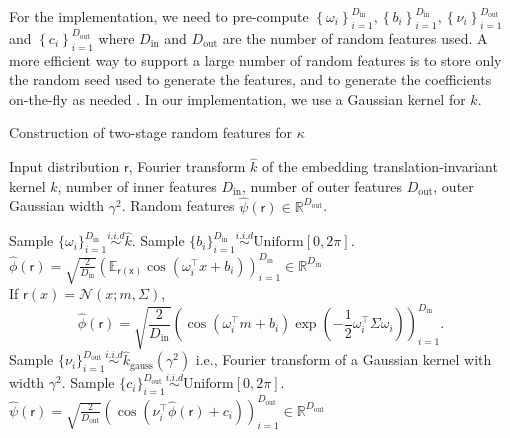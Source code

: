 \documentclass[english]{article}
\theoremstyle{plain}
\theoremstyle{plain}
\begin{document}
For the implementation, we need to pre-compute $\left\{ \omega_{i}\right\} _{i=1}^{D_\mathrm{in}},\left\{ b_{i}\right\} _{i=1}^{D_\mathrm{in}},\left\{ \nu_{i}\right\} _{i=1}^{D_\mathrm{out}}$
and $\left\{ c_{i}\right\} _{i=1}^{D_\mathrm{out}}$ where $D_\mathrm{in}$ and
$D_\mathrm{out}$ are the number of random features used. 
A more efficient way to support a large number of random features 
is to store only the random seed used to generate 
the features, and to generate the coefficients  on-the-fly as needed \citep{Dai2014}. 
In our implementation, we use a Gaussian kernel for $k$.



\begin{algorithm}[t]
\caption{Construction of two-stage random features for $\kappa$}
\label{algo:random_features_kgg}
\begin{algorithmic}[1]
\REQUIRE Input distribution $\mathsf{r}$, Fourier transform $\hat{k}$ of 
the embedding translation-invariant kernel $k$, number of inner features $D_\mathrm{in}$, number of outer features $D_\mathrm{out}$, outer Gaussian width $\gamma^2$.
\ENSURE Random features $\hat{\psi}(\mathsf{r}) \in \mathbb{R}^{D_\mathrm{out}}$. 

\STATE Sample  $\{ \omega_i \}_{i=1}^{D_\mathrm{in}} \overset{i.i.d}{\sim} \hat{k}$.
\STATE Sample $\{b_i\}_{i=1}^{D_\mathrm{in}} \overset{i.i.d}{\sim} \text{Uniform}[0, 2\pi] $.
\STATE $\hat{\phi}(\mathsf{r}) = \sqrt{\frac{2}{D_\mathrm{in}}} \left( \mathbb{E}_{\mathsf{r(x)}} 
\cos(\omega_{i}^{\top}x+b_{i} ) \right)_{i=1}^{D_\mathrm{in}} \in \mathbb{R}^{D_\mathrm{in}}$ \\
If $\mathsf{r}(x)=\mathcal{N}(x;m, \Sigma )$, 
\small
\begin{equation*}
\hat{\phi}( \mathsf{r}) = \sqrt{\frac{2}{D_\mathrm{in}}} \left( \cos(\omega_{i}^{\top}m +b_{i}) \exp 
\left(-\frac{1}{2}\omega_{i}^{\top}\Sigma \omega_{i} \right) \right)_{i=1}^{D_\mathrm{in}}.
\end{equation*}
%
\STATE Sample $\{ \nu_i \}_{i=1}^{D_\mathrm{out}} \overset{i.i.d}{\sim} \hat{k}_{\text{gauss}}(\gamma^{2})$
i.e., Fourier transform of a Gaussian kernel with width $\gamma^2$.
\STATE Sample $\{c_i\}_{i=1}^{D_\mathrm{out}} \overset{i.i.d}{\sim} \text{Uniform}[0, 2\pi] $.
\STATE $\hat{\psi}(\mathsf{r}) = \sqrt{\frac{2}{D_\mathrm{out}}} \left(  
\cos(\nu_{i}^{\top} \hat{\phi}(\mathsf{r}) + c_{i} ) \right)_{i=1}^{D_\mathrm{out}} \in 
\mathbb{R}^{D_\mathrm{out}}$
\end{algorithmic}
\end{algorithm}
\end{document}
